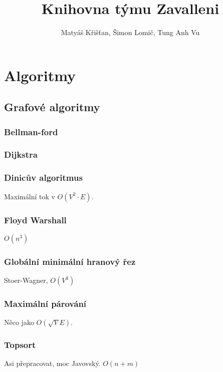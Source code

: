 \documentclass[10pt, a4paper]{article}
\title{Knihovna týmu Zavalleni}
\author{Matyáš Křišťan, Šimon Lomič, Tung Anh Vu}
\begin{document}
\tableofcontents

\section{Algoritmy}
\subsection{Grafové algoritmy}

\subsubsection{Bellman-ford}


\subsubsection{Dijkstra}


\subsubsection{Dinicův algoritmus}
Maximální tok v $O(V^2 \cdot E)$.


\subsubsection{Floyd Warshall}
$O(n^3)$


\subsubsection{Globální minimální hranový řez}
Stoer-Wagner, $O(V^3)$


\subsubsection{Maximální párování}
Něco jako $O(\sqrt{V}E)$.


\subsubsection{Topsort}
Asi přepracovat, moc Javovský. $O(n + m)$

\end{document}
